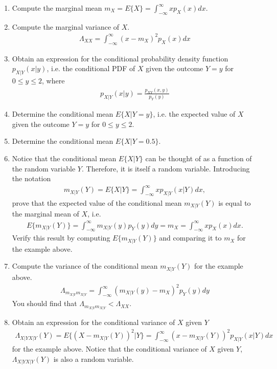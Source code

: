 \documentclass[letterpaper,12pt]{article}
\begin{document}
\begin{enumerate}
\begin{enumerate}
    \item
    Compute the marginal mean $m_X = E\{X\} = \int_{-\infty}^\infty x p_X(x)dx$.

    \item
    Compute the marginal variance of $X$.
    \begin{align*}
\Lambda_{XX} = \int_{-\infty}^\infty (x - m_X)^2 p_X(x)dx
    \end{align*}

    \item
    Obtain an expression for the conditional probability density function $p_{X|Y}(x|y)$, i.e. the conditional PDF of $X$ given the outcome $Y = y$ for $0 \leq y \leq 2$, where
    \begin{align*}
p_{X|Y}(x|y) = \frac{p_{XY}(x,y)}{p_Y(y)}
    \end{align*}

    \item
    Determine the conditional mean $E\{X | Y=y\}$, i.e. the expected value of $X$ given the outcome $Y = y$ for $0 \leq y \leq 2$.

    \item
    Determine the conditional mean $E\{X | Y=0.5\}$.

    \item
    Notice that the conditional mean $E\{X | Y\}$ can be thought of as a function of the random variable $Y$. Therefore, it is itself a random variable. Introducing the notation
    \begin{align*}
m_{X|Y}(Y) = E\{X | Y\} = \int_{-\infty}^\infty x p_{X|Y}(x|Y)dx,
    \end{align*}
prove that the expected value of the conditional mean $m_{X|Y}(Y)$ is equal to the marginal mean of $X$, i.e.
    \begin{align*}
E\{m_{X|Y}(Y)\} = \int_{-\infty}^\infty m_{X|Y}(y)p_Y(y)dy = m_X = \int_{-\infty}^\infty x p_X(x)dx.
    \end{align*}
Verify this result by computing $E\{m_{X|Y}(Y)\}$ and comparing it to $m_X$ for the example above.

    \item
    Compute the variance of the conditional mean $m_{X|Y}(Y)$ for the example above.
    \begin{align*}
\Lambda_{m_{X|Y} m_{X|Y}} = \int_{-\infty}^\infty (m_{X|Y}(y) - m_X)^2 p_Y(y) dy
    \end{align*}
You should find that $\Lambda_{m_{X|Y} m_{X|Y}} < \Lambda_{XX}$.

    \item
    Obtain an expression for the conditional variance of $X$ given $Y$
    \begin{align*}
\Lambda_{X|Y X|Y}(Y) = E\{(X - m_{X|Y}(Y))^2 | Y\} = \int_{-\infty}^\infty (x - m_{X|Y}(Y))^2 p_{X|Y}(x|Y) dx
    \end{align*}
for the example above. Notice that the conditional variance of $X$ given $Y$, $\Lambda_{X|Y X|Y}(Y)$ is also a random variable.


\end{enumerate}
\end{enumerate}
\end{document}
